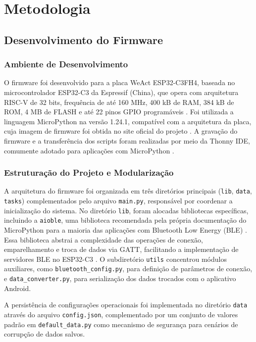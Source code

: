 \chapter[Metodologia]{Metodologia}

\section{Desenvolvimento do Firmware}
\subsection{Ambiente de Desenvolvimento}
O firmware foi desenvolvido para a placa WeAct ESP32-C3FH4, baseada no microcontrolador ESP32-C3 da Espressif (China), que opera com arquitetura RISC-V de 32 bits, frequência de até 160 MHz, 400 kB de RAM, 384 kB de ROM, 4 MB de FLASH e até 22 pinos GPIO programáveis \cite{weact_esp32c3}. Foi utilizada a linguagem MicroPython na versão 1.24.1, compatível com a arquitetura da placa, cuja imagem de firmware foi obtida no site oficial do projeto \cite{micropython_esp32c3_download}. A gravação do firmware e a transferência dos scripts foram realizadas por meio da Thonny IDE, comumente adotado para aplicações com MicroPython \cite{thonny_ide}.

\subsection{Estruturação do Projeto e Modularização}
A arquitetura do firmware foi organizada em três diretórios principais (\texttt{lib}, \texttt{data}, \texttt{tasks}) complementados pelo arquivo \texttt{main.py}, responsável por coordenar a inicialização do sistema. No diretório \texttt{lib}, foram alocadas bibliotecas específicas, incluindo a \texttt{aioble}, uma biblioteca recomendada pela própria documentação do MicroPython para a maioria das aplicações com Bluetooth Low Energy (BLE) \cite{micropython_ble_docs}. Essa biblioteca abstrai a complexidade das operações de conexão, emparelhamento e troca de dados via GATT, facilitando a implementação de servidores BLE no ESP32-C3 \cite{aioble_repo}. O subdiretório \texttt{utils} concentrou módulos auxiliares, como \texttt{bluetooth\_config.py}, para definição de parâmetros de conexão, e \texttt{data\_converter.py}, para serialização dos dados trocados com o aplicativo Android.

A persistência de configurações operacionais foi implementada no diretório \texttt{data} através do arquivo \texttt{config.json}, complementado por um conjunto de valores padrão em \texttt{default\_data.py} como mecanismo de segurança para cenários de corrupção de dados salvos.

